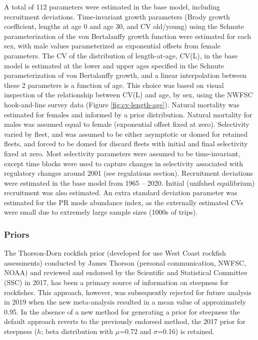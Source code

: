 \documentclass[11pt,
  english,
  a4paper,
]{article}
\begin{document}
A total of 112 parameters were estimated in the base model, including recruitment deviations. Time-invariant growth parameters (Brody growth coefficient, lengths at age 0 and age 30, and CV old/young) using the Schnute parameterization of the von Bertalanffy growth function were estimated for each sex, with male values parameterized as exponential offsets from female parameters. The CV of the distribution of length-at-age, CV(L), in the base model is estimated at the lower and upper ages specified in the Schnute parameterization of von Bertalanffy growth, and a linear interpolation between these 2 parameters is a function of age. This choice was based on visual inspection of the relationship between CV(L) and age, by sex, using the NWFSC hook-and-line survey data (Figure \ref{fig:cv-length-age}). Natural mortality was estimated for females and informed by a prior distribution. Natural mortality for males was assumed equal to female (exponential offset fixed at zero). Selectivity varied by fleet, and was assumed to be either asymptotic or domed for retained fleets, and forced to be domed for discard fleets with initial and final selectivity fixed at zero. Most selectivity parameters were assumed to be time-invariant, except time blocks were used to capture changes in selectivity associated with regulatory changes around 2001 (see regulations section). Recruitment deviations were estimated in the base model from 1965 -- 2020. Initial (unifshed equilibrium) recruitment was also estimated. An extra standard deviation parameter was estimated for the PR mode abundance index, as the externally estimated CVs were small due to extremely large sample sizes (1000s of trips).


\hypertarget{priors}{%
\subsubsection{Priors}\label{priors}}

\leavevmode\tagmcend\tagstructend

The Thorson-Dorn rockfish prior (developed for use West Coast rockfish assessments) conducted by James Thorson (personal communication, NWFSC, NOAA) and reviewed and endorsed by the Scientific and Statistical Committee (SSC) in 2017, has been a primary source of information on steepness for rockfishes. This approach, however, was subsequently rejected for future analysis in 2019 when the new meta-analysis resulted in a mean value of approximately 0.95. In the absence of a new method for generating a prior for steepness the default approach reverts to the previously endorsed method, the 2017 prior for steepness ({\(h\)\leavevmode\tagmcend\tagstructend}; beta distribution with {\(\mu\)\leavevmode\tagmcend\tagstructend}=0.72 and {\(\sigma\)\leavevmode\tagmcend\tagstructend}=0.16) is retained.
\end{document}
